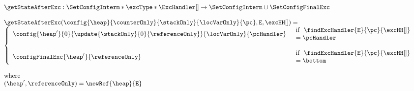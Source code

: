  
 $$\begin{array}{l}
          \getStateAfterExc : \SetConfigInterm * \excType * \ExcHandler[] \rightarrow \SetConfigInterm \cup \SetConfigFinalExc  \\
	  \\
	  \getStateAfterExc( \config{\heap}{\counterOnly}{\stackOnly}{\locVarOnly}{\pc}, \mbox{\rm\texttt{E}},  \excHH[] ) = \\
          \left\{\begin{array}{ll}
	        \config{\heap'}{0}{\update{\stackOnly}{0}{\referenceOnly}}{\locVarOnly}{\pcHandler} & \begin{array}{l}  
                                                                                                           \mbox{\rm if \ \findExcHandler{\mbox{\rm\texttt{E}}}{\pc}{\excHH[]}} \\
													   =\pcHandler 
												      \end{array}	   
													   \\
		& \\
		\configFinalExc{\heap'}{\referenceOnly} & \begin{array}{l}     
		                                                             \mbox{\rm  if \ \findExcHandler{\mbox{\rm\texttt{E}}}{\pc}{\excHH[]} } \\
		                                                             = \bottom  
		                                                        \end{array}
	  \end{array}\right.\\
	  \\
        \mbox{\rm where }\\
	(\heap', \referenceOnly )= \newRef{\heap}{\mbox{\rm\texttt{E}}}
    \end{array}
 $$

